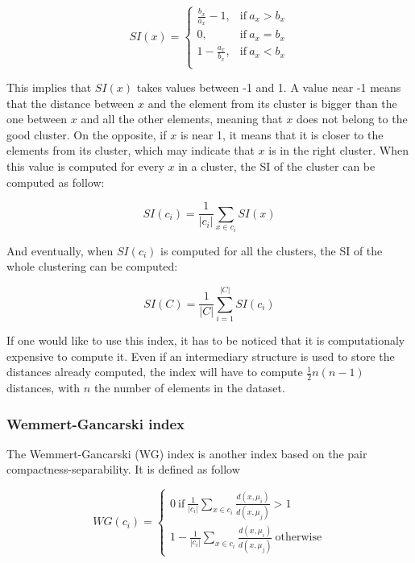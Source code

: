     \begin{equation}
        SI(x) = 
        \begin{cases}
            \frac{b_x}{a_x} - 1, & \text{if}\ a_x > b_x \\
            0, & \text{if}\ a_x = b_x \\
            1 - \frac{a_x}{b_x}, & \text{if}\ a_x < b_x \\
        \end{cases}
        \label{eq:si_x_detail}
    \end{equation}

    This implies that $SI(x)$ takes values between -1 and 1. A value near -1 means that the distance between $x$ and the element from its cluster is bigger than the one between $x$ and all the other elements, meaning that $x$ does not belong to the good cluster. On the opposite, if $x$ is near 1, it means that it is closer to the elements from its cluster, which may indicate that $x$ is in the right cluster. When this value is computed for every $x$ in a cluster, the SI of the cluster can be computed as follow:

    \begin{equation}
        SI(c_i) = \frac{1}{|c_i|}\sum_{x \in c_i} SI(x)
        \label{eq:si_ci}
    \end{equation}

    And eventually, when $SI(c_i)$ is computed for all the clusters, the SI of the whole clustering can be computed:

    \begin{equation}
        SI(C) = \frac{1}{|C|}\sum_{i=1}^{|C|} SI(c_i)
        \label{eq:si_clustering}
    \end{equation}

    If one would like to use this index, it has to be noticed that it is computationaly expensive to compute it. Even if an intermediary structure is used to store the distances already computed, the index will have to compute $\frac{1}{2}n(n-1)$ distances, with $n$ the number of elements in the dataset.
    
    \subsubsection{Wemmert-Gancarski index}
    The Wemmert-Gancarski (WG) index is another index based on the pair compactness-separability. It is defined as follow

    \begin{equation}
        WG(c_i) = 
        \begin{cases}
            0 ~ \text{if}\ \frac{1}{|c_i|}\sum_{x \in c_i} \frac{d(x,\mu_i)}{d(x, \mu_j)} > 1\\
            1 - \frac{1}{|c_i|}\sum_{x \in c_i} \frac{d(x,\mu_i)}{d(x, \mu_j)} ~ \text{otherwise}
        \end{cases}
        \label{eq:wg_index}
    \end{equation}

